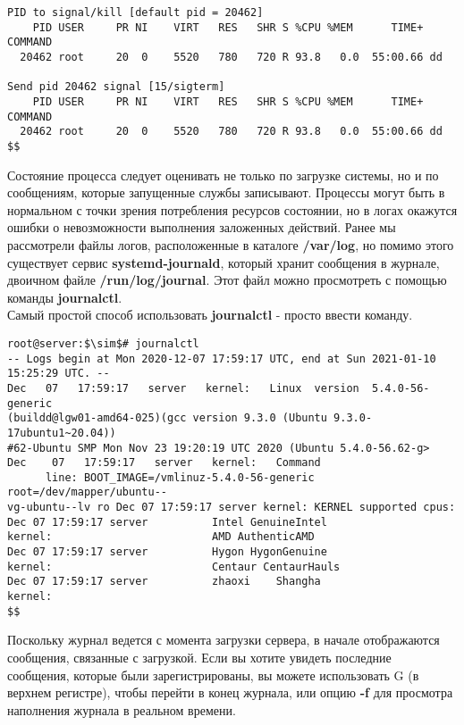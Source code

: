 \documentclass[14pt, a4paper]{article}
\begin{document}
\begin{lstlisting}
PID to signal/kill [default pid = 20462]
    PID USER     PR NI    VIRT   RES   SHR S %CPU %MEM      TIME+ COMMAND
  20462 root     20  0    5520   780   720 R 93.8   0.0  55:00.66 dd

Send pid 20462 signal [15/sigterm]
    PID USER     PR NI    VIRT   RES   SHR S %CPU %MEM      TIME+ COMMAND
  20462 root     20  0    5520   780   720 R 93.8   0.0  55:00.66 dd
$$
\end{lstlisting}
\vspace{0.3cm}

Состояние процесса следует оценивать не только по загрузке системы, но и по сообщениям, которые
запущенные службы записывают. Процессы могут быть в нормальном с точки зрения потребления
ресурсов состоянии, но в логах окажутся ошибки о невозможности выполнения заложенных действий.
Ранее мы рассмотрели файлы логов, расположенные в каталоге \textbf{/var/log}, но помимо этого существует
сервис \textbf{systemd-journald}, который хранит сообщения в журнале, двоичном файле \textbf{/run/log/journal}.
Этот файл можно просмотреть с помощью команды \textbf{journalctl}.\\

Самый простой способ использовать \textbf{journalctl} - просто ввести команду.

\vspace{0.3cm}
\begin{lstlisting}
root@server:$\sim$# journalctl
-- Logs begin at Mon 2020-12-07 17:59:17 UTC, end at Sun 2021-01-10 
15:25:29 UTC. --
Dec   07   17:59:17   server   kernel:   Linux  version  5.4.0-56-generic
(buildd@lgw01-amd64-025)(gcc version 9.3.0 (Ubuntu 9.3.0-17ubuntu1~20.04))
#62-Ubuntu SMP Mon Nov 23 19:20:19 UTC 2020 (Ubuntu 5.4.0-56.62-g>
Dec    07   17:59:17   server   kernel:   Command
      line: BOOT_IMAGE=/vmlinuz-5.4.0-56-generic root=/dev/mapper/ubuntu--
vg-ubuntu--lv ro Dec 07 17:59:17 server kernel: KERNEL supported cpus:
Dec 07 17:59:17 server          Intel GenuineIntel
kernel:                         AMD AuthenticAMD
Dec 07 17:59:17 server          Hygon HygonGenuine
kernel:                         Centaur CentaurHauls
Dec 07 17:59:17 server          zhaoxi    Shangha
kernel:
$$
\end{lstlisting}
\vspace{0.2cm}

Поскольку журнал ведется с момента загрузки сервера, в начале отображаются сообщения,
связанные с загрузкой. Если вы хотите увидеть последние сообщения, которые были
зарегистрированы, вы можете использовать G (в верхнем регистре), чтобы перейти в конец журнала,
или опцию \textbf{-f} для просмотра наполнения журнала в реальном времени.\\
\end{document}
